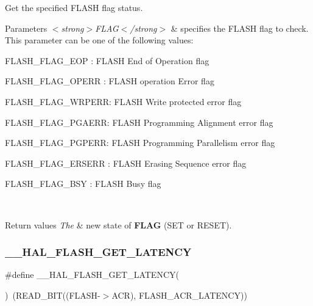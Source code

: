 Get the specified F\+L\+A\+SH flag status. 


\begin{DoxyParams}{Parameters}
{\em $<$strong$>$\+F\+L\+A\+G$<$/strong$>$} & specifies the F\+L\+A\+SH flag to check. This parameter can be one of the following values\+: \begin{DoxyItemize}
\item F\+L\+A\+S\+H\+\_\+\+F\+L\+A\+G\+\_\+\+E\+OP \+: F\+L\+A\+SH End of Operation flag \item F\+L\+A\+S\+H\+\_\+\+F\+L\+A\+G\+\_\+\+O\+P\+E\+RR \+: F\+L\+A\+SH operation Error flag \item F\+L\+A\+S\+H\+\_\+\+F\+L\+A\+G\+\_\+\+W\+R\+P\+E\+RR\+: F\+L\+A\+SH Write protected error flag \item F\+L\+A\+S\+H\+\_\+\+F\+L\+A\+G\+\_\+\+P\+G\+A\+E\+RR\+: F\+L\+A\+SH Programming Alignment error flag \item F\+L\+A\+S\+H\+\_\+\+F\+L\+A\+G\+\_\+\+P\+G\+P\+E\+RR\+: F\+L\+A\+SH Programming Parallelism error flag \item F\+L\+A\+S\+H\+\_\+\+F\+L\+A\+G\+\_\+\+E\+R\+S\+E\+RR \+: F\+L\+A\+SH Erasing Sequence error flag \item F\+L\+A\+S\+H\+\_\+\+F\+L\+A\+G\+\_\+\+B\+SY \+: F\+L\+A\+SH Busy flag \end{DoxyItemize}
\\
\hline
\end{DoxyParams}

\begin{DoxyRetVals}{Return values}
{\em The} & new state of {\bfseries{F\+L\+AG}} (S\+ET or R\+E\+S\+ET). \\
\hline
\end{DoxyRetVals}
\mbox{\label{group___f_l_a_s_h___exported___macros_gaa537e44d74ce35ff5bfef80edf03f895}} 
\subsubsection{\texorpdfstring{\_\_HAL\_FLASH\_GET\_LATENCY}{\_\_HAL\_FLASH\_GET\_LATENCY}}
{\footnotesize\ttfamily \#define \+\_\+\+\_\+\+H\+A\+L\+\_\+\+F\+L\+A\+S\+H\+\_\+\+G\+E\+T\+\_\+\+L\+A\+T\+E\+N\+CY(\begin{DoxyParamCaption}{ }\end{DoxyParamCaption})~(R\+E\+A\+D\+\_\+\+B\+IT((F\+L\+A\+SH-\/$>$A\+CR), F\+L\+A\+S\+H\+\_\+\+A\+C\+R\+\_\+\+L\+A\+T\+E\+N\+CY))}



